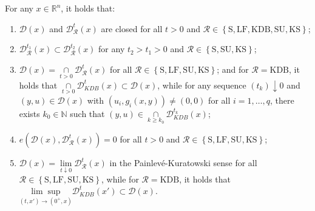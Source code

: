 \begin{proposition}\label{lem} For any $x\in\mathbb{R}^{n}$, it holds that:
	\begin{enumerate}

\item[$(a)$] $\mathcal{D}(x)$ and  $\mathcal{D}^{t}_{\mathcal{R}}(x)$ are closed for all $t > 0$ and $\mathcal{R}\in \left\{\mbox{S}, \mbox{LF}, \mbox{KDB}, \mbox{SU}, \mbox{KS}\right\}$;

\item[$(b)$] $\mathcal{D}^{t_{1}}_{\mathcal{R}}(x)\subset\mathcal{D}^{t_{2}}_{\mathcal{R}}(x)$ for any
$t_{2}>t_{1}>0$ and $\mathcal{R}\in \left\{\mbox{S},  \mbox{SU}, \mbox{KS}\right\}$;

\item[$(c)$] $\mathcal{D}(x) = \underset{t>0}{\cap}\mathcal{D}^{t}_{\mathcal{R}}(x)$ for all $\mathcal{R}\in \left\{\mbox{S}, \mbox{LF},  \mbox{SU}, \mbox{KS}\right\}$; and for $\mathcal{R}=\mbox{KDB}$, it holds that 
$\underset{t>0}{\cap}\mathcal{D}_{KDB}^{t}(x)\subset\mathcal{D}(x)$, while 
for any sequence $(t_{k})\downarrow0$ and $(y,u)\in\mathcal{D}(x)$ with 
$(u_{i},g_{i}(x,y))\neq(0,0)$ for all $i=1, \ldots, q$, there exists $k_{0}\in\mathbb{N}$ such that $(y,u)\in\underset{k\geq k_{0}}{\cap}\mathcal{D}_{KDB}^{t_{k}}(x)$;

\item[$(d)$] $e\left(\mathcal{D}(x),\mathcal{D}^{t}_{\mathcal{R}}(x)\right)=0$ for all $t>0$ and $\mathcal{R}\in \left\{\mbox{S}, \mbox{LF}, \mbox{SU}, \mbox{KS}\right\}$;

 \item[$(e)$] $\mathcal{D}(x) = \underset{t\downarrow0}{\lim}\mathcal{D}^{t}_{\mathcal{R}}(x)$ in the Painlev\'{e}-Kuratowski sense  for all $\mathcal{R}\in \left\{\mbox{S}, \mbox{LF}, \mbox{SU}, \mbox{KS}\right\}$, while for $\mathcal{R}=\mbox{KDB}$, it holds that    {$\underset{(t,x')\rightarrow (0^+,x)}{\lim\sup}
\mathcal{D}_{KDB}^{t}(x')\subset\mathcal{D}(x)$}.
\end{enumerate}
\end{proposition}
